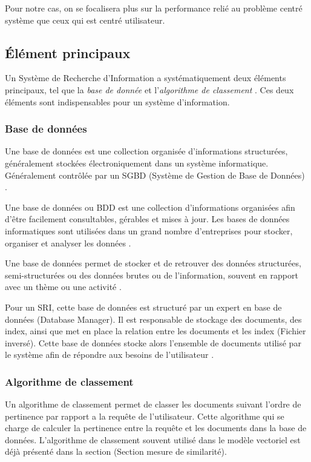Pour notre cas, on se focalisera plus sur la performance relié au problème centré système que ceux qui est centré utilisateur.

\subsection{Élément principaux}
Un Système de Recherche d'Information a systématiquement deux éléments principaux, tel que la \textit{base de donnée} et l'\textit{algorithme de classement} \citep{approche-semantique}. Ces deux éléments sont indispensables pour un système d'information.

\subsubsection{Base de données}
\begin{definition}
	Une base de données est une collection organisée d’informations structurées, généralement stockées
	électroniquement dans un système informatique. Généralement contrôlée par un SGBD (Système de Gestion de Base de Données) \citep{oracle-database}.
\end{definition}

\begin{definition}
	Une base de données ou BDD est une collection d’informations organisées afin d’être facilement consultables, gérables et mises à jour. Les bases de données informatiques sont utilisées dans un grand nombre d’entreprises pour stocker, organiser et analyser les données \citep{lebigdata}.
\end{definition}

\begin{definition}
	Une base de données permet de stocker et de retrouver des données structurées, semi-structurées ou des données brutes ou de l'information, souvent en rapport avec un thème ou une activité	\citep{wiki-database}.
\end{definition}

Pour un SRI, cette base de données est structuré par un expert en base de données (Database Manager). Il est responsable de stockage des documents, des index, ainsi que met en place la relation entre les documents et les index (Fichier inversé). Cette base de données stocke alors l'ensemble de documents utilisé par le système afin de répondre aux besoins de l'utilisateur \citep{vsm-for-arabic-language}.

\subsubsection{Algorithme de classement}
Un algorithme de classement permet de classer les documents suivant l'ordre de pertinence par rapport a la requête de l'utilisateur. Cette algorithme qui se charge de calculer la pertinence entre la requête et les documents dans la base de données. L'algorithme de classement souvent utilisé dans le modèle vectoriel est déjà présenté dans la section (Section mesure de similarité).

